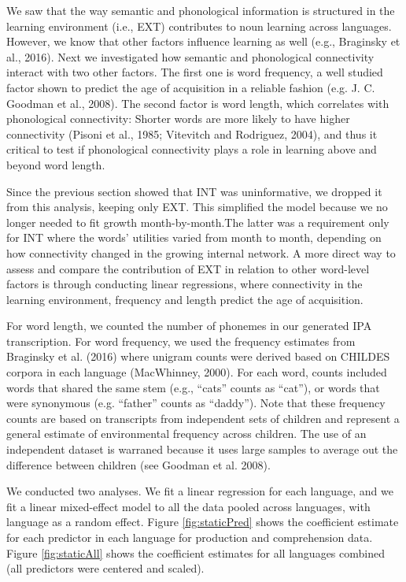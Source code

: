 \documentclass[english,floatsintext,man]{apa6}
\theoremstyle{definition}
\theoremstyle{definition}
\theoremstyle{definition}
\theoremstyle{remark}
\begin{document}
We saw that the way semantic and phonological information is structured
in the learning environment (i.e., EXT) contributes to noun learning
across languages. However, we know that other factors influence learning
as well (e.g., Braginsky et al., 2016). Next we investigated how
semantic and phonological connectivity interact with two other factors.
The first one is word frequency, a well studied factor shown to predict
the age of acquisition in a reliable fashion (e.g. J. C. Goodman et al.,
2008). The second factor is word length, which correlates with
phonological connectivity: Shorter words are more likely to have higher
connectivity (Pisoni et al., 1985; Vitevitch and Rodriguez, 2004), and
thus it critical to test if phonological connectivity plays a role in
learning above and beyond word length.

Since the previous section showed that INT was uninformative, we dropped
it from this analysis, keeping only EXT. This simplified the model
because we no longer needed to fit growth month-by-month.The latter was
a requirement only for INT where the words' utilities varied from month
to month, depending on how connectivity changed in the growing internal
network. A more direct way to assess and compare the contribution of EXT
in relation to other word-level factors is through conducting linear
regressions, where connectivity in the learning environment, frequency
and length predict the age of acquisition.

For word length, we counted the number of phonemes in our generated IPA
transcription. For word frequency, we used the frequency estimates from
Braginsky et al. (2016) where unigram counts were derived based on
CHILDES corpora in each language (MacWhinney, 2000). For each word,
counts included words that shared the same stem (e.g., \enquote{cats}
counts as \enquote{cat}), or words that were synonymous (e.g.
\enquote{father} counts as \enquote{daddy}). Note that these frequency
counts are based on transcripts from independent sets of children and
represent a general estimate of environmental frequency across children.
The use of an independent dataset is warraned because it uses large
samples to average out the difference between children (see Goodman et
al. 2008).

We conducted two analyses. We fit a linear regression for each language,
and we fit a linear mixed-effect model to all the data pooled across
languages, with language as a random effect. Figure \ref{fig:staticPred}
shows the coefficient estimate for each predictor in each language for
production and comprehension data. Figure \ref{fig:staticAll} shows the
coefficient estimates for all languages combined (all predictors were
centered and scaled).
\end{document}
